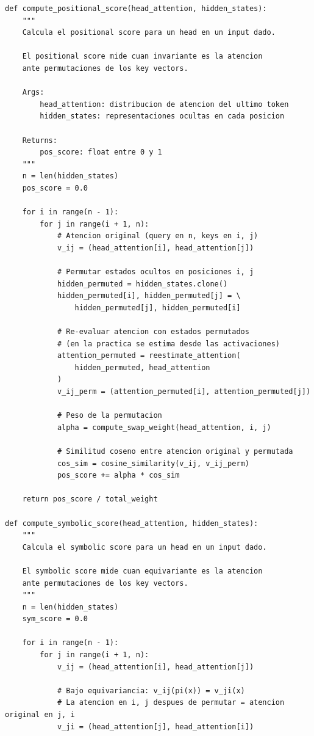 \documentclass[12pt,a4paper]{report}
\begin{document}
\begin{lstlisting}
def compute_positional_score(head_attention, hidden_states):
    """
    Calcula el positional score para un head en un input dado.
    
    El positional score mide cuan invariante es la atencion
    ante permutaciones de los key vectors.
    
    Args:
        head_attention: distribucion de atencion del ultimo token
        hidden_states: representaciones ocultas en cada posicion
    
    Returns:
        pos_score: float entre 0 y 1
    """
    n = len(hidden_states)
    pos_score = 0.0
    
    for i in range(n - 1):
        for j in range(i + 1, n):
            # Atencion original (query en n, keys en i, j)
            v_ij = (head_attention[i], head_attention[j])
            
            # Permutar estados ocultos en posiciones i, j
            hidden_permuted = hidden_states.clone()
            hidden_permuted[i], hidden_permuted[j] = \
                hidden_permuted[j], hidden_permuted[i]
            
            # Re-evaluar atencion con estados permutados
            # (en la practica se estima desde las activaciones)
            attention_permuted = reestimate_attention(
                hidden_permuted, head_attention
            )
            v_ij_perm = (attention_permuted[i], attention_permuted[j])
            
            # Peso de la permutacion
            alpha = compute_swap_weight(head_attention, i, j)
            
            # Similitud coseno entre atencion original y permutada
            cos_sim = cosine_similarity(v_ij, v_ij_perm)
            pos_score += alpha * cos_sim
    
    return pos_score / total_weight

def compute_symbolic_score(head_attention, hidden_states):
    """
    Calcula el symbolic score para un head en un input dado.
    
    El symbolic score mide cuan equivariante es la atencion
    ante permutaciones de los key vectors.
    """
    n = len(hidden_states)
    sym_score = 0.0
    
    for i in range(n - 1):
        for j in range(i + 1, n):
            v_ij = (head_attention[i], head_attention[j])
            
            # Bajo equivariancia: v_ij(pi(x)) = v_ji(x)
            # La atencion en i, j despues de permutar = atencion original en j, i
            v_ji = (head_attention[j], head_attention[i])
            

\end{lstlisting}
\end{document}
